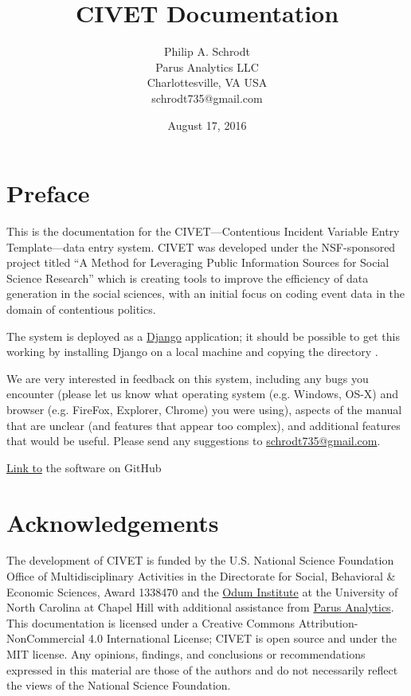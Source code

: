 \documentclass[letterpaper,10pt,english]{sphinxmanual}
\title{CIVET Documentation}
\date{August 17, 2016}
\author{Philip A. Schrodt\\Parus Analytics LLC\\Charlottesville, VA USA\\schrodt735@gmail.com}
\begin{document}
\maketitle
\tableofcontents
{}\label{index::doc}\section*{Preface}
This is the documentation for the CIVET—Contentious Incident Variable Entry Template—data entry system.
CIVET was developed under the NSF-sponsored project titled “A Method for Leveraging Public Information
Sources for Social Science Research” which is creating tools to improve the efficiency of data generation
in the social sciences, with an initial focus on coding event data in the domain of contentious politics.

The system is deployed as a \href{https://www.djangoproject.com/start/overview/}{Django} application;
it should be possible to get this working by installing Django on a local machine and copying the directory .

We are very interested in feedback on this system, including any bugs
you encounter (please let us know what operating system (e.g. Windows,
OS-X) and browser (e.g. FireFox, Explorer, Chrome) you were using),
aspects of the manual that are unclear (and features that appear too
complex), and additional features that would be useful. Please send any
suggestions to \href{mailto:schrodt735@gmail.com}{schrodt735@gmail.com}.

\href{https://github.com/civet-software}{Link to} the software on GitHub
\section*{Acknowledgements}
The development of CIVET is funded by the U.S. National Science Foundation Office of Multidisciplinary Activities
in the Directorate for Social, Behavioral \& Economic Sciences, Award 1338470 and the \href{http://www.odum.unc.edu/odum/home2.jsp}{Odum Institute} at the University of North Carolina at Chapel Hill with additional assistance from \href{http://parusanalytics.com/}{Parus Analytics}. This documentation is licensed under a Creative Commons Attribution-NonCommercial 4.0 International License; CIVET is open source and under the MIT license.
Any opinions, findings, and conclusions or recommendations expressed in this material are those of the authors
and do not necessarily reflect the views of the National Science Foundation.
\end{document}

